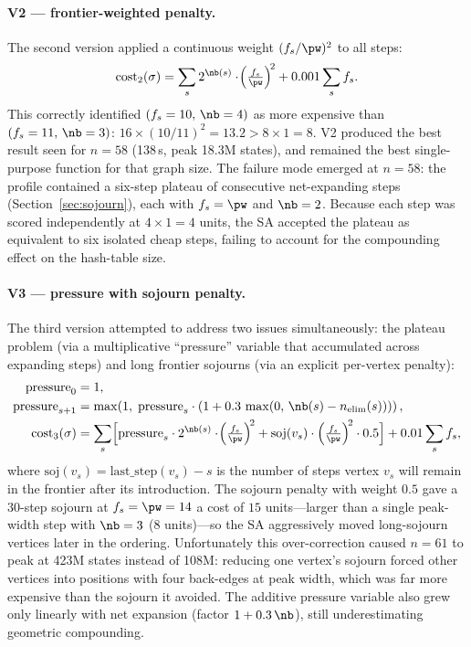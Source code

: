 \paragraph{V2 — frontier-weighted penalty.}
The second version applied a continuous weight $(f_s/\pw)^2$ to all
steps:
\[
  \mathrm{cost}_2(\sigma)
    = \sum_s 2^{\nb(s)} \cdot \!\left(\tfrac{f_s}{\pw}\right)^{\!2}
      + 0.001 \sum_s f_s.
\]
This correctly identified $(f_s=10,\,\nb=4)$ as more expensive than
$(f_s=11,\,\nb=3)$: $16 \times (10/11)^2 = 13.2 > 8 \times 1 = 8$.
V2 produced the best result seen for $n=58$ (138\,s, peak 18.3M
states), and remained the best single-purpose function for that graph
size.
The failure mode emerged at $n=58$: the profile contained a six-step
plateau of consecutive net-expanding steps (Section~\ref{sec:sojourn}),
each with $f_s = \pw$ and $\nb = 2$.
Because each step was scored independently at $4 \times 1 = 4$ units,
the SA accepted the plateau as equivalent to six isolated cheap steps,
failing to account for the compounding effect on the hash-table size.

\paragraph{V3 — pressure with sojourn penalty.}
The third version attempted to address two issues simultaneously:
the plateau problem (via a multiplicative ``pressure'' variable that
accumulated across expanding steps) and long frontier sojourns (via an
explicit per-vertex penalty):
\begin{align*}
  \mathrm{pressure}_0 &= 1, \\
  \mathrm{pressure}_{s+1} &= \max\!\left(1,\; \mathrm{pressure}_s
      \cdot (1 + 0.3\,\max(0,\, \nb(s) - n_\mathrm{elim}(s)))\right), \\
  \mathrm{cost}_3(\sigma)
    &= \sum_s \Bigl[
        \mathrm{pressure}_s \cdot 2^{\nb(s)} \cdot \!\left(\tfrac{f_s}{\pw}\right)^{\!2}
        + \mathrm{soj}(v_s) \cdot \left(\tfrac{f_s}{\pw}\right)^{\!2} \cdot 0.5
      \Bigr]
      + 0.01 \sum_s f_s,
\end{align*}
where $\mathrm{soj}(v_s) = \mathrm{last\_step}(v_s) - s$ is the number
of steps vertex $v_s$ will remain in the frontier after its introduction.
The sojourn penalty with weight $0.5$ gave a 30-step sojourn at $f_s =
\pw = 14$ a cost of $15$ units---larger than a single peak-width step
with $\nb = 3$ ($8$ units)---so the SA aggressively moved long-sojourn
vertices later in the ordering.
Unfortunately this over-correction caused $n=61$ to peak at 423M states
instead of 108M: reducing one vertex's sojourn forced other vertices
into positions with four back-edges at peak width, which was far more
expensive than the sojourn it avoided.
The additive pressure variable also grew only linearly with net
expansion (factor $1+0.3\,\nb$), still underestimating geometric
compounding.

